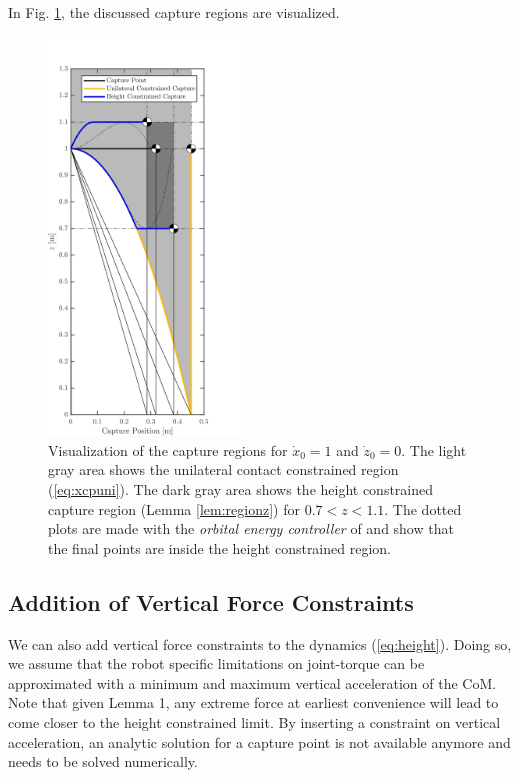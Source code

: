 \documentclass[letterpaper, 10 pt, conference]{ieeeconf}  %
\begin{document}
In Fig. \ref{fig:capregion}, the discussed capture regions are visualized.
\begin{figure}[h]
      \centering
      \includegraphics[width=2in]{CPLimitsDark.png}
      \caption{Visualization of the capture regions for $\dot{x}_0=1$ and $\dot{z}_0=0$. The light gray area shows the unilateral contact constrained region (\ref{eq:xcpuni}). The dark gray area shows the height constrained capture region (Lemma \ref{lem:regionz})  for $0.7<z<1.1$. The dotted plots are made with the \textit{orbital energy controller} of \cite{koolen2016balance} and show that the final points are inside the height constrained region.}
      \label{fig:capregion}
\end{figure}

\subsection{Addition of Vertical Force Constraints}\label{forcecapture}
We can also add vertical force constraints to the dynamics (\ref{eq:height}). Doing so, we assume that the robot specific limitations on joint-torque can be approximated with a minimum and maximum vertical acceleration of the CoM. Note that given Lemma 1, any extreme force at earliest convenience will lead to come closer to the height constrained limit. By inserting a constraint on vertical acceleration, an analytic solution for a capture point is not available anymore and needs to be solved numerically. 
\end{document}
